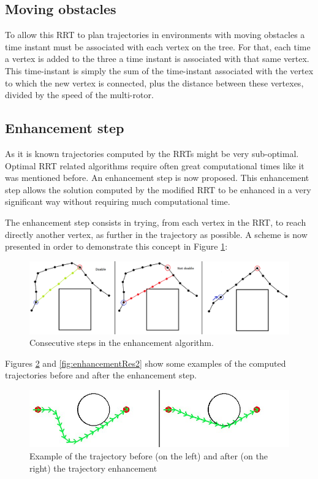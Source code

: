 \subsection{Moving obstacles}
To allow this RRT to plan trajectories in environments with moving obstacles a time instant must be associated with each vertex on the tree. For that, each time a vertex is added to the three a time instant is associated with that same vertex. This time-instant is simply the sum of the time-instant associated with the vertex to which the new vertex is connected, plus the distance between these vertexes, divided by the speed of the multi-rotor.

\subsection{Enhancement step}

As it is known trajectories computed by the RRTs might be very sub-optimal. Optimal RRT related algorithms require often great computational times like it was mentioned before. An enhancement step is now proposed. This enhancement step allows the solution computed by the modified RRT to be enhanced in a very significant way without requiring much computational time.
\par
The enhancement step consists in trying, from each vertex in the RRT, to reach directly another vertex, as further in the trajectory as possible. A scheme is now presented in order to demonstrate this concept in Figure \ref{fig:enhancement}:

\begin{figure}[ht!]
    \centering
    \includegraphics[width=\linewidth]{Figures/04_rrt/REPORTfIGURE.png}
    \caption{Consecutive steps in the enhancement algorithm.}
    \label{fig:enhancement}
\end{figure}

Figures \ref{fig:enhancementRes1} and \ref{fig:enhancementRes2} show some examples of the computed trajectories before and after the enhancement step.

\begin{figure}[ht!]
    \centering
    \includegraphics[width=0.6\linewidth]{Figures/04_rrt/result1.png}
    \caption{Example of the trajectory before (on the left) and after (on the right) the trajectory enhancement}
    \label{fig:enhancementRes1}
\end{figure}

